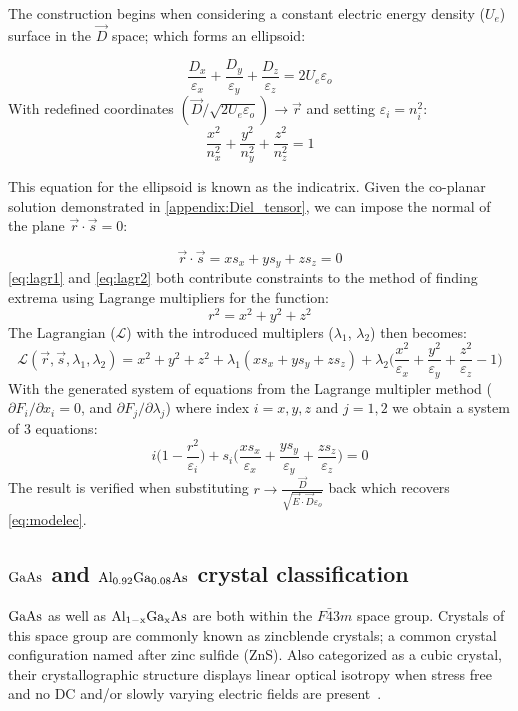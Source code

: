 The construction begins when considering a constant electric energy density ($U_e$) surface in the $\vec{D}$ space; which forms an ellipsoid: 

\begin{equation}\label{eq:lagr1}
\frac{D_x}{\varepsilon_x} + \frac{D_y}{\varepsilon_y} + \frac{D_z}{\varepsilon_z} = 2 U_e \varepsilon_o
\end{equation}
With redefined coordinates $(\vec{D}/\sqrt{2 U_e \varepsilon_o}) \rightarrow \vec{r}$ and setting $\varepsilon_i = n^2_i$:
\begin{equation}
\frac{x^2}{n_x^2} + \frac{y^2}{n_y^2} + \frac{z^2}{n_z^2} = 1
\end{equation}

This equation for the ellipsoid is known as the indicatrix. Given the co-planar solution demonstrated in \autoref{appendix:Diel_tensor}, we can impose the normal of the plane $\vec{r} \cdot \vec{s} = 0$:

\begin{equation}\label{eq:lagr2}
\vec{r} \cdot \vec{s} = x s_x + y s_y + z s_z = 0
\end{equation}
\autoref{eq:lagr1} and \autoref{eq:lagr2} both contribute constraints to the method of finding extrema using Lagrange multipliers for the function:
\begin{equation}
r^2 = x^2 + y^2 + z^2
\end{equation}
The Lagrangian ($\mathcal{L}$) with the introduced multiplers ($\lambda_1$, $\lambda_2$) then becomes:
\begin{equation}
\mathcal{L}(\vec{r},\vec{s},\lambda_1, \lambda_2) =
x^2 + y^2 + z^2 + \lambda_1 (xs_x + ys_y + zs_z) + \lambda_2 \bigg( \frac{x^2}{\varepsilon_x} + \frac{y^2}{\varepsilon_y} + \frac{z^2}{\varepsilon_z} - 1 \bigg)
\end{equation}
With the generated system of equations from the Lagrange multipler method ($\partial F_i/ \partial x_i = 0$, and $\partial F_j/ \partial \lambda_j$) where index $i =x,y,z$ and $j = 1,2$ we obtain a system of 3 equations:
\begin{equation}
i \bigg(1-\frac{r^2}{\varepsilon_{i}} \bigg) + s_{i} \bigg(\frac{x s_x}{\varepsilon_x} + \frac{y s_y}{\varepsilon_y} + \frac{z s_z}{\varepsilon_z} \bigg) = 0
\end{equation}
The result is verified when substituting $r \rightarrow \frac{\vec{D}}{\sqrt{\vec{E} \cdot \vec{D} \varepsilon_o}}$ back which recovers \autoref{eq:modelec}.
\\
\subsection{\texorpdfstring{$\mathrm{GaAs}$}{gaas} and \texorpdfstring{$\mathrm{Al_{0.92}Ga_{0.08}As}$}{algaas} crystal classification}
$\mathrm{GaAs}$ as well as $\mathrm{Al_{1-x}Ga_{x}As}$ are both within the $F\bar{4}3m$ space group. Crystals of this space group are commonly known as zincblende crystals; a common crystal configuration named after zinc sulfide (ZnS). Also categorized as a cubic crystal, their crystallographic structure displays linear optical isotropy when stress free and no DC and/or slowly varying electric fields are present~\cite{boyd:2008}. 

